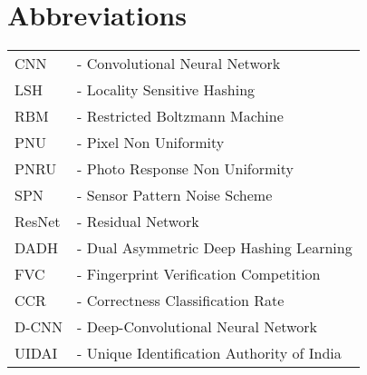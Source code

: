 \chapter*{Abbreviations}
\begin{center}
\small{
\begin{tabular}{ll}

        CNN     &- Convolutional Neural Network \\
        LSH     &- Locality Sensitive Hashing \\
        RBM		&- Restricted Boltzmann Machine	\\
        PNU		&- Pixel Non Uniformity	\\
        PNRU	&- Photo Response Non Uniformity	\\
        SPN		&- Sensor Pattern Noise Scheme	\\
        ResNet	&- Residual Network	\\
        DADH	&- Dual Asymmetric Deep Hashing Learning	\\
        FVC		&- Fingerprint Verification Competition	\\
        CCR		&- Correctness Classification Rate	\\
        D-CNN	&- Deep-Convolutional Neural Network	\\
        UIDAI	&- Unique Identification Authority of India 	\\
      
\end{tabular}
}
\end{center}

\clearpage 

